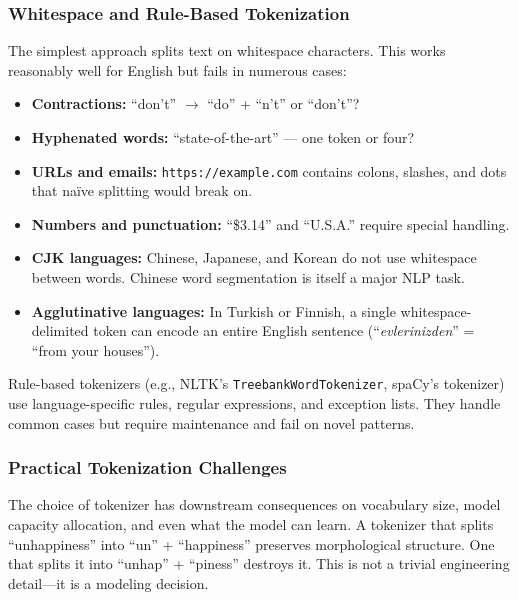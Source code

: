 \subsubsection{Whitespace and Rule-Based Tokenization}

The simplest approach splits text on whitespace characters. This works reasonably well for
English but fails in numerous cases:

\begin{itemize}
    \item \textbf{Contractions:} ``don't'' $\to$ ``do'' + ``n't'' or ``don't''?
    \item \textbf{Hyphenated words:} ``state-of-the-art'' --- one token or four?
    \item \textbf{URLs and emails:} \texttt{https://example.com} contains colons, slashes,
          and dots that na\"ive splitting would break on.
    \item \textbf{Numbers and punctuation:} ``\$3.14'' and ``U.S.A.'' require special
          handling.
    \item \textbf{CJK languages:} Chinese, Japanese, and Korean do not use whitespace
          between words. Chinese word segmentation is itself a major NLP task.
    \item \textbf{Agglutinative languages:} In Turkish or Finnish, a single whitespace-
          delimited token can encode an entire English sentence
          (``\emph{evlerinizden}'' = ``from your houses'').
\end{itemize}

Rule-based tokenizers (e.g., NLTK's \texttt{TreebankWordTokenizer}, spaCy's tokenizer)
use language-specific rules, regular expressions, and exception lists. They handle
common cases but require maintenance and fail on novel patterns.

\subsubsection{Practical Tokenization Challenges}

\begin{keyinsight}
The choice of tokenizer has downstream consequences on vocabulary size, model capacity
allocation, and even what the model can learn. A tokenizer that splits ``unhappiness'' into
``un'' + ``happiness'' preserves morphological structure. One that splits it into ``unhap''
+ ``piness'' destroys it. This is not a trivial engineering detail---it is a modeling
decision.
\end{keyinsight}

